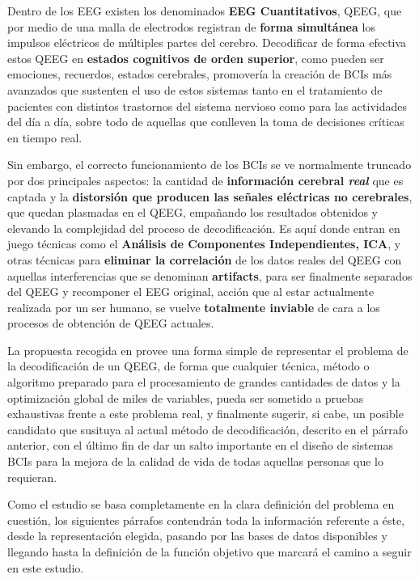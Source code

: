 Dentro de los EEG existen los denominados \textbf{EEG Cuantitativos}, QEEG\cite{QEEG}, que por medio de una malla de electrodos registran de \textbf{forma simultánea} los impulsos eléctricos de múltiples partes del cerebro. Decodificar de forma efectiva estos QEEG en \textbf{estados cognitivos de orden superior}\cite{EvolutionaryBigOpt}, como pueden ser emociones, recuerdos, estados cerebrales, promovería la creación de BCIs más avanzados que sustenten el uso de estos sistemas tanto en el tratamiento de pacientes con distintos trastornos del sistema nervioso como para las actividades del día a día, sobre todo de aquellas que conlleven la toma de decisiones críticas en tiempo real.

Sin embargo, el correcto funcionamiento de los BCIs se ve normalmente truncado por dos principales aspectos: la cantidad de \textbf{información cerebral \textit{real}} que es captada y la \textbf{distorsión que producen las señales eléctricas no cerebrales}, que quedan plasmadas en el QEEG, empañando los resultados obtenidos y elevando la complejidad del proceso de decodificación. Es aquí donde entran en juego técnicas como el \textbf{Análisis de Componentes Independientes, ICA}, y otras técnicas para \textbf{eliminar la correlación} de los datos reales del QEEG con aquellas interferencias que se denominan \textbf{artifacts}, para ser finalmente separados del QEEG y recomponer el EEG original, acción que al estar actualmente realizada por un ser humano, se vuelve \textbf{totalmente inviable} de cara a los procesos de obtención de QEEG actuales.

La propuesta recogida en\cite{EvolutionaryBigOpt} provee una forma simple de representar el problema de la decodificación de un QEEG, de forma que cualquier técnica, método o algoritmo preparado para el procesamiento de grandes cantidades de datos y la optimización global de miles de variables, pueda ser sometido a pruebas exhaustivas frente a este problema real, y finalmente sugerir, si cabe, un posible candidato que susituya al actual método de decodificación, descrito en el párrafo anterior, con el último fin de dar un salto importante en el diseño de sistemas BCIs para la mejora de la calidad de vida de todas aquellas personas que lo requieran.

Como el estudio se basa completamente en la clara definición del problema en cuestión, los siguientes párrafos contendrán toda la información referente a éste, desde la representación elegida, pasando por las bases de datos disponibles y llegando hasta la definición de la función objetivo que marcará el camino a seguir en este estudio.

